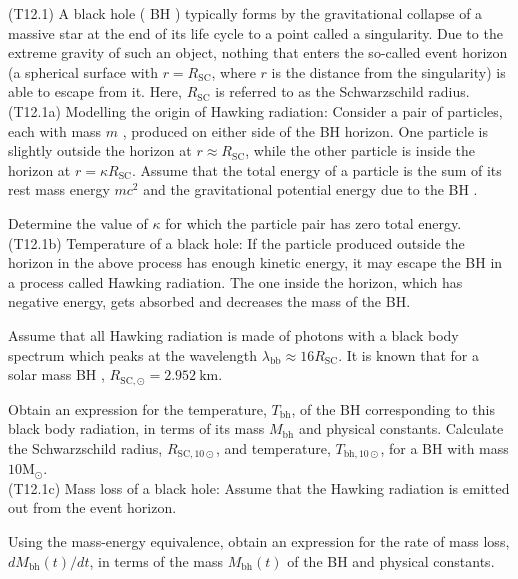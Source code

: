 \documentclass[10pt]{article}
\begin{document}
    (T12.1) A black hole ( BH ) typically forms by the gravitational collapse of a massive star at the end of its life cycle to a point called a singularity. Due to the extreme gravity of such an object, nothing that enters the so-called event horizon (a spherical surface with $r=R_{\mathrm{SC}}$, where $r$ is the distance from the singularity) is able to escape from it. Here, $R_{\mathrm{SC}}$ is referred to as the Schwarzschild radius.\\
    (T12.1a) Modelling the origin of Hawking radiation: Consider a pair of particles, each with mass $m$ , produced on either side of the BH horizon. One particle is slightly outside the horizon at $r \approx R_{\mathrm{SC}}$, while the other particle is inside the horizon at $r=\kappa R_{\mathrm{SC}}$. Assume that the total energy of a particle is the sum of its rest mass energy $m c^{2}$ and the gravitational potential energy due to the BH .
    
    Determine the value of $\kappa$ for which the particle pair has zero total energy.\\
    (T12.1b) Temperature of a black hole: If the particle produced outside the horizon in the above process has enough kinetic energy, it may escape the BH in a process called Hawking radiation. The one inside the horizon, which has negative energy, gets absorbed and decreases the mass of the BH.
    
    Assume that all Hawking radiation is made of photons with a black body spectrum which peaks at the wavelength $\lambda_{\mathrm{bb}} \approx 16 R_{\mathrm{SC}}$. It is known that for a solar mass BH , $R_{\mathrm{SC}, \odot}=2.952 \mathrm{~km}$.
    
    Obtain an expression for the temperature, $T_{\mathrm{bh}}$, of the BH corresponding to this black body radiation, in terms of its mass $M_{\mathrm{bh}}$ and physical constants. Calculate the Schwarzschild radius, $R_{\mathrm{SC}, 10 \odot}$, and temperature, $T_{\mathrm{bh}, 10 \odot}$, for a BH with mass $10 \mathrm{M}_{\odot}$.\\
    (T12.1c) Mass loss of a black hole: Assume that the Hawking radiation is emitted out from the event horizon.
    
    Using the mass-energy equivalence, obtain an expression for the rate of mass loss, $d M_{\mathrm{bh}}(t) / d t$, in terms of the mass $M_{\mathrm{bh}}(t)$ of the BH and physical constants.
    
\end{document}
